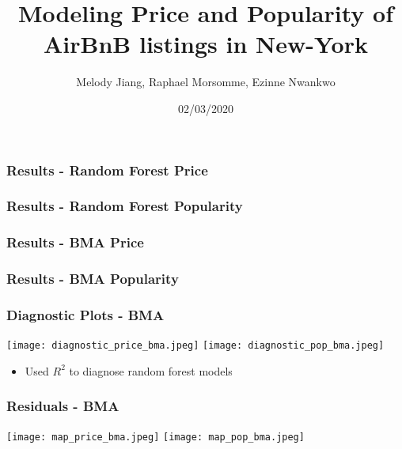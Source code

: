 \documentclass{beamer}
\title{Modeling Price and Popularity of AirBnB listings in New-York}
\author{Melody Jiang, Raphael Morsomme, Ezinne Nwankwo}
\institute{Department of Statistical Science, Duke University}
\date{02/03/2020}
\begin{document}
\frame{\titlepage}




\begin{frame}
\frametitle{Results - Random Forest Price}

\end{frame}

\begin{frame}
\frametitle{Results - Random Forest Popularity}

\end{frame}

\begin{frame}
\frametitle{Results - BMA Price}

\end{frame}

\begin{frame}
\frametitle{Results - BMA Popularity}

\end{frame}


\begin{frame}
\frametitle{Diagnostic Plots - BMA}
\texttt{[image: diagnostic\_price\_bma.jpeg]}
\texttt{[image: diagnostic\_pop\_bma.jpeg]}
\begin{itemize}
	\item Used $R^2$ to diagnose random forest models
\end{itemize}
\end{frame} 

\begin{frame}
\frametitle{Residuals - BMA}
\texttt{[image: map\_price\_bma.jpeg]}
\texttt{[image: map\_pop\_bma.jpeg]}
\end{frame} 
\end{document}
